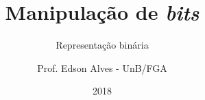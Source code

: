 \title{Manipulação de \textit{bits}}
\subtitle{Representação binária}
\author{Prof. Edson Alves - UnB/FGA}
\date{2018}
